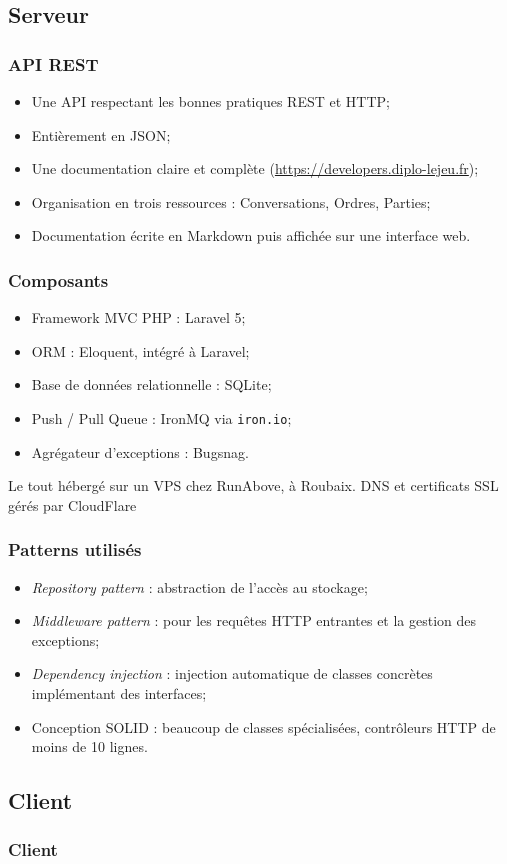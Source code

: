 \subsection{Serveur}
	\begin{frame}
		\frametitle{API REST}
		\begin{itemize}
			\item Une API respectant les bonnes pratiques REST et HTTP;
			\item Entièrement en JSON;
			\item Une documentation claire et complète (\url{https://developers.diplo-lejeu.fr});
			\item Organisation en trois ressources : Conversations, Ordres, Parties;
			\item Documentation écrite en Markdown puis affichée sur une interface web.
		\end{itemize}
	\end{frame}

	\begin{frame}
		\frametitle{Composants}
		\begin{itemize}
			\item Framework MVC PHP : Laravel 5;
			\item ORM : Eloquent, intégré à Laravel;
			\item Base de données relationnelle : SQLite;
			\item Push / Pull Queue : IronMQ via \texttt{iron.io};
			\item Agrégateur d'exceptions : Bugsnag.
		\end{itemize}\bigskip
		Le tout hébergé sur un VPS chez RunAbove, à Roubaix. DNS et certificats SSL gérés par CloudFlare
	\end{frame}

	\begin{frame}
		\frametitle{Patterns utilisés}
		\begin{itemize}
			\item \textit{Repository pattern} : abstraction de l'accès au stockage;
			\item \textit{Middleware pattern} : pour les requêtes HTTP entrantes et la gestion des exceptions;
			\item \textit{Dependency injection} : injection automatique de classes concrètes implémentant des interfaces;
			\item Conception SOLID : beaucoup de classes spécialisées, contrôleurs HTTP de moins de 10 lignes.
		\end{itemize}
	\end{frame}

\subsection{Client}
	\begin{frame}
		\frametitle{Client}
	\end{frame}
